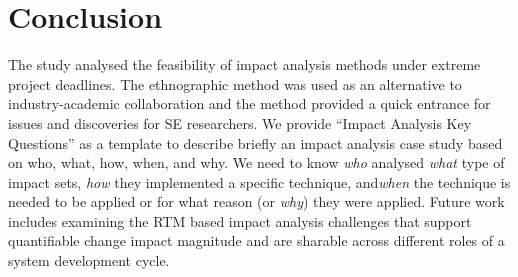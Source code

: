 \documentclass[conference]{IEEEtran}
\begin{document}
\section{Conclusion}

The study analysed the feasibility of impact analysis methods under
extreme project deadlines. The ethnographic method was used as an
alternative to industry-academic collaboration and the method provided
a quick entrance for issues and discoveries for SE researchers. We
provide ``Impact Analysis Key Questions'' as a template to describe
briefly an impact analysis case study based on who, what, how, when,
and why. We need to know \textit{who} analysed \textit{what} type of
impact sets, \textit{how} they implemented a specific technique,
and\textit{when} the technique is needed to be applied or for what
reason (or \textit{why}) they were applied.  Future work includes
examining the RTM based impact analysis challenges that support
quantifiable change impact magnitude and are sharable across different
roles of a system development cycle.





 
\end{document}
